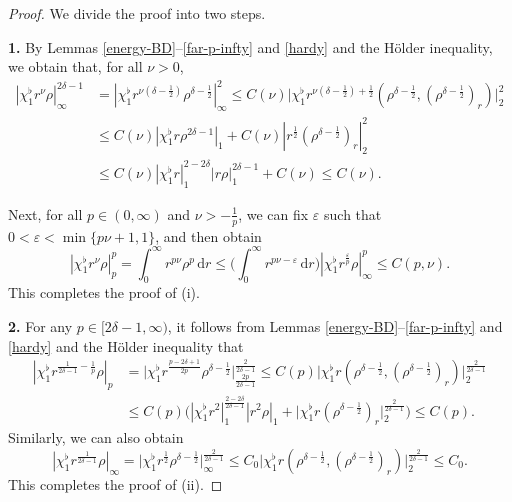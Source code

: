 \documentclass[11pt,reqno]{amsart}
\numberwithin{rk}{section}
\numberwithin{prop}{section}
\numberwithin{mydef}{section}
\numberwithin{lem}{section}
\numberwithin{equation}{section}
\numberwithin{thm}{section}
\begin{document}
\begin{proof}
We divide the proof into two steps.

\smallskip
\textbf{1.} By Lemmas \ref{energy-BD}--\ref{far-p-infty} and \ref{hardy} 
and the H\"older inequality, we obtain that, for all $\nu>0$,
\begin{equation*}
\begin{aligned}
|\chi_1^\flat r^\nu \rho|_\infty^{2\delta-1}&=|\chi_1^\flat r^{\nu(\delta-\frac{1}{2})} \rho^{\delta-\frac{1}{2}}|_\infty^2 \leq C(\nu)\big|\chi_1^\flat r^{\nu(\delta-\frac{1}{2})+\frac{1}{2}}(\rho^{\delta-\frac{1}{2}},(\rho^{\delta-\frac{1}{2}})_r)\big|_2^2\\
&\leq C(\nu) |\chi_1^\flat r \rho^{2\delta-1}|_1+C(\nu)| r^{\frac{1}{2}} (\rho^{\delta-\frac{1}{2}})_r|_2^2 \\
&\leq C(\nu) |\chi_1^\flat r|_1^{2-2\delta}|r \rho|_1^{2\delta-1}+C(\nu)\leq C(\nu).
\end{aligned}
\end{equation*}

Next, for all $p\in(0,\infty)$ and $\nu>-\frac{1}{p}$, we can fix $\varepsilon$ such that $0<\varepsilon<\min\{p\nu +1,1\}$, and then obtain
\begin{equation*}
|\chi_1^\flat r^\nu \rho|_p^p=\int_0^\infty  r^{p\nu} \rho^p\,\mathrm{d}r \leq \Big(\int_0^\infty  r^{p\nu-\varepsilon} \,\mathrm{d}r\Big) |\chi_1^\flat r^\frac{\varepsilon}{p}\rho|_\infty^p\leq C(p,\nu).
\end{equation*}
This completes the proof of (i).

\smallskip
\textbf{2.} For any $p\in[2\delta-1,\infty)$, it follows from Lemmas \ref{energy-BD}--\ref{far-p-infty} and \ref{hardy} and the H\"older inequality that  
\begin{equation*}
\begin{aligned}
|\chi_1^\flat r^{\frac{1}{2\delta-1}-\frac{1}{p}}\rho|_p&=\big|\chi_1^\flat r^{\frac{p-2\delta+1}{2p}}\rho^{\delta-\frac{1}{2}}\big|_{\frac{2p}{2\delta-1}}^\frac{2}{2\delta-1}\leq C(p)\big|\chi_1^\flat r (\rho^{\delta-\frac{1}{2}},(\rho^{\delta-\frac{1}{2}})_r)\big|_2^\frac{2}{2\delta-1}\\
&\leq C(p)\big(|\chi_1^\flat r^2|_1^{\frac{2-2\delta}{2\delta-1}} |r^2 \rho|_1+\big|\chi_1^\flat r(\rho^{\delta-\frac{1}{2}})_r\big|_2^\frac{2}{2\delta-1}\big)\leq C(p).
\end{aligned}
\end{equation*}
Similarly, we can also obtain
\begin{equation*}
|\chi_1^\flat r^{\frac{1}{2\delta-1}}\rho|_\infty=\big|\chi_1^\flat r^\frac{1}{2}\rho^{\delta-\frac{1}{2}}\big|_{\infty}^\frac{2}{2\delta-1}\leq C_0\big|\chi_1^\flat r (\rho^{\delta-\frac{1}{2}},(\rho^{\delta-\frac{1}{2}})_r)\big|_2^\frac{2}{2\delta-1} \leq C_0.
\end{equation*}
This completes the proof of (ii). 
\end{proof}
\end{document}
